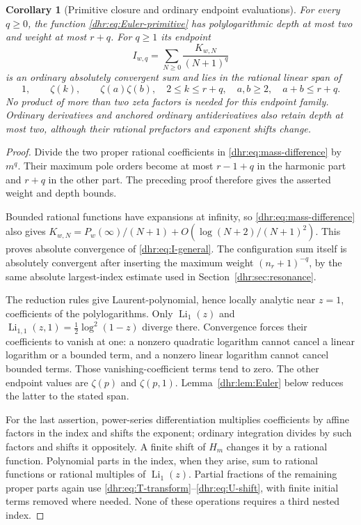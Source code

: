 \documentclass[11pt,letterpaper]{article}
\numberwithin{equation}{section}
\newtheorem{corollary}[theorem]{Corollary}
\theoremstyle{definition}\newtheorem{definition}[theorem]{Definition}
\theoremstyle{remark}\newtheorem{remark}[theorem]{Remark}
\DeclareMathOperator{\Li}{Li}
\begin{document}
\begin{corollary}[Primitive closure and ordinary endpoint evaluations]
\label{dhr:cor:endpoint}
For every $q\geq0$, the function \eqref{dhr:eq:Euler-primitive} has
polylogarithmic depth at most two and weight at most $r+q$.
For $q\geq1$ its endpoint
\begin{equation}\label{dhr:eq:I-general}
 I_{w,q}=\sum_{N\geq0}\frac{K_{w,N}}{(N+1)^q}
\end{equation}
is an ordinary absolutely convergent sum and lies in the rational
linear span of
\[
 1,\qquad \zeta(k),\qquad \zeta(a)\zeta(b),
 \quad 2\leq k\leq r+q,\quad a,b\geq2,\quad a+b\leq r+q.
\]
No product of more than two zeta factors is needed for this endpoint
family. Ordinary derivatives and anchored ordinary antiderivatives
also retain depth at most two, although their rational prefactors
and exponent shifts change.
\end{corollary}

\begin{proof}
Divide the two proper rational coefficients in
\eqref{dhr:eq:mass-difference} by $m^q$. Their maximum pole orders
become at most $r-1+q$ in the harmonic part and $r+q$ in the other
part. The preceding proof therefore gives the asserted weight and
depth bounds.

Bounded rational functions have expansions at infinity, so
\eqref{dhr:eq:mass-difference} also gives
$K_{w,N}=P_w(\infty)/(N+1)+O(\log(N+2)/(N+1)^2)$.
This proves absolute convergence of \eqref{dhr:eq:I-general}.
The configuration sum itself is absolutely convergent after inserting
the maximum weight $(n_r+1)^{-q}$, by the same absolute
largest-index estimate used in Section~\ref{dhr:sec:resonance}.

The reduction rules give Laurent-polynomial, hence locally analytic
near $z=1$, coefficients of the polylogarithms. Only $\Li_1(z)$
and $\Li_{1,1}(z,1)=\tfrac12\log^2(1-z)$ diverge there. Convergence
forces their coefficients to vanish at one: a nonzero quadratic
logarithm cannot cancel a linear logarithm or a bounded term, and
a nonzero linear logarithm cannot cancel bounded terms. Those
vanishing-coefficient terms tend to zero. The other endpoint values
are $\zeta(p)$ and $\zeta(p,1)$. Lemma~\ref{dhr:lem:Euler} below
reduces the latter to the stated span.

For the last assertion, power-series differentiation multiplies
coefficients by affine factors in the index and shifts the exponent;
ordinary integration divides by such factors and shifts it oppositely.
A finite shift of $H_m$ changes it by a rational function. Polynomial
parts in the index, when they arise, sum to rational functions or
rational multiples of $\Li_1(z)$. Partial fractions of the remaining
proper parts again use \eqref{dhr:eq:T-transform}--\eqref{dhr:eq:U-shift},
with finite initial terms removed where needed. None of these operations
requires a third nested index.
\end{proof}
\end{document}
